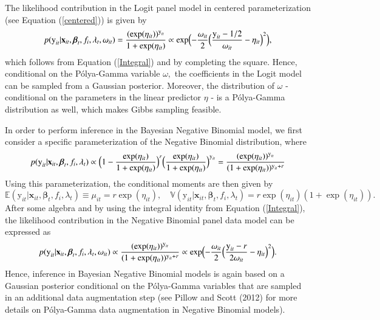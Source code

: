 \documentclass[a4paper, preprint, 3p,
authoryear]{elsarticle} %
\begin{document}
The likelihood contribution in the Logit panel model in centered
parameterization (see Equation (\ref{centered})) is given by
\begin{equation*}
 p(\text{y}_{it}|\textbf{x}_{it},\boldsymbol{\beta}_t,f_i,\lambda_t,\omega_{it}) = \frac{(\exp(\eta_{it}))^{\text{y}_{it}}}{1+\exp(\eta_{it})} \propto  \exp\Bigl(-\frac{\omega_{it}}{2}\Bigl(\frac{\text{y}_{it}-1/2}{\omega_{it}}-\eta_{it}\Bigr)^2\Bigr),
\end{equation*} which follows from Equation (\ref{Integral}) and by
completing the square. Hence, conditional on the Pólya-Gamma variable
\(\omega,\) the coefficients in the Logit model can be sampled from a
Gaussian posterior. Moreover, the distribution of \(\omega\) -
conditional on the parameters in the linear predictor \(\eta\) - is a
Pólya-Gamma distribution as well, which makes Gibbs sampling feasible.

In order to perform inference in the Bayesian Negative Binomial model,
we first consider a specific parameterization of the Negative Binomial
distribution, where \begin{equation*}
 p(\text{y}_{it}|\textbf{x}_{it},\boldsymbol{\beta}_t,f_i,\lambda_t) \propto \Bigl(1-\frac{\exp(\eta_{it})}{1+\exp(\eta_{it})}\Bigr)^r \Bigl(\frac{\exp(\eta_{it})}{1+\exp(\eta_{it})}\Bigr)^{\text{y}_{it}} = \frac{(\exp(\eta_{it}))^{\text{y}_{it}}}{(1+\exp(\eta_{it}))^{\text{y}_{it} + r}}
\end{equation*} Using this parameterization, the conditional moments are
then given by \begin{equation*}
 \mathbb{E}(\text{y}_{it}|\textbf{x}_{it},\boldsymbol{\beta}_t,f_i,\lambda_t) \equiv \mu_{it} = r  \exp(\eta_{it}), \quad \mathbb{V}(\text{y}_{it}|\textbf{x}_{it},\boldsymbol{\beta}_t,f_i,\lambda_t) = r \exp(\eta_{it}) (1 + \exp(\eta_{it})).
\end{equation*} After some algebra and by using the integral identity
from Equation (\ref{Integral}), the likelihood contribution in the
Negative Binomial panel data model can be expressed as \begin{equation*}
 p(\text{y}_{it}|\textbf{x}_{it},\boldsymbol{\beta}_t,f_i,\lambda_t, \omega_{it}) \propto 
 \frac{(\exp(\eta_{it}))^{\text{y}_{it}}}{(1+\exp(\eta_{it}))^{\text{y}_{it} + r}} \propto \exp\Bigl(-\frac{\omega_{it}}{2}\Bigl(\frac{\text{y}_{it}-r}{2\omega_{it}} - \eta_{it}\Bigr)^2\Bigr).
\end{equation*} Hence, inference in Bayesian Negative Binomial models is
again based on a Gaussian posterior conditional on the Pólya-Gamma
variables that are sampled in an additional data augmentation step (see
Pillow and Scott (2012) for more details on Pólya-Gamma data
augmentation in Negative Binomial models).
\end{document}
